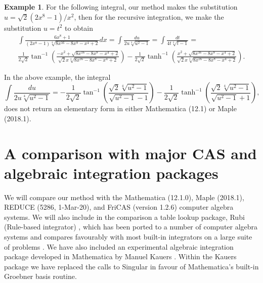 \documentclass[12pt]{article}
\numberwithin{equation}{section}
\theoremstyle{definition}
\newtheorem{example}{Example}[section]
\begin{document}
\begin{example}
For the following integral, our method makes the substitution 
$u = \sqrt{2}\left(2x^8-1\right)/x^2$, then for the recursive integration, we make 
the substitution $u = t^2$ to obtain 
\begin{multline*}
\int \frac{6 x^8+1}{\left(2 x^8-1\right) \sqrt[4]{8 x^{16}-8 x^8-x^4+2}} dx =
 \int\frac{du}{2 u \sqrt[4]{u^2-1}} = \int \frac{dt}{4 t \sqrt[4]{t-1}} = \\
\frac{1}{2 \sqrt{2}} \tan ^{-1}\left(\frac{-x^2+\sqrt{8 x^{16}-8 x^8-x^4+2}}{\sqrt{2} x \sqrt[4]{8 x^{16}-8x^8-x^4+2}}\right) - 
\frac{1}{2 \sqrt{2}} \tanh ^{-1}\left(\frac{x^2+\sqrt{8 x^{16}-8x^8-x^4+2}}{\sqrt{2} x \sqrt[4]{8 x^{16}-8 x^8-x^4+2}}\right).
\end{multline*}
\end{example}

In the above example, the integral 
$$\int\frac{du}{2 u \sqrt[4]{u^2-1}} = 
-\frac{1}{2\sqrt{2}} \tan ^{-1}\left(\frac{\sqrt{2} \sqrt[4]{u^2-1}}{\sqrt{u^2-1}-1}\right) - 
\frac{1}{2\sqrt{2}} \tanh ^{-1}\left(\frac{\sqrt{2} \sqrt[4]{u^2-1}}{\sqrt{u^2-1}+1}\right),$$ 
does not return an elementary form in either Mathematica (12.1) or Maple (2018.1).

\section{A comparison with major CAS and algebraic integration packages}

We will compare our method with the Mathematica (12.1.0), Maple (2018.1), REDUCE (5286, 1-Mar-20), 
and FriCAS (version 1.2.6) computer algebra systems. We will also include in the comparison a table 
lookup package, Rubi (Rule-based integrator) \cite{Rich2018}, which has been ported to a number of computer algebra systems 
and compares favourably with most built-in integrators on a large suite of problems \cite{rubi_results}. 
We have also included an experimental algebraic integration package developed in Mathematica by Manuel 
Kauers \cite{Kauers2008}. Within the Kauers package we have replaced the calls to Singular in favour
of Mathematica's built-in Groebner basis routine.\\
\end{document}
